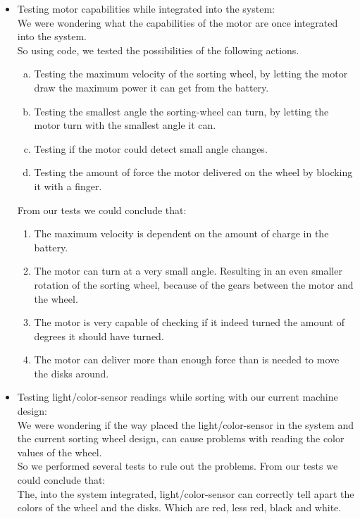 \begin{itemize}
\item Testing motor capabilities while integrated into the system:\\
We were wondering what the capabilities of the motor are once integrated into the system.\\
So using code, we tested the possibilities of the following actions.
\begin{enumerate}[a.]
\item{Testing the maximum velocity of the sorting wheel, by letting the motor draw the maximum power it can get from the battery.}
\item{Testing the smallest angle the sorting-wheel can turn, by letting the motor turn with the smallest angle it can.}
\item{Testing if the motor could detect small angle changes.}
\item{Testing the amount of force the motor delivered on the wheel by blocking it with a finger.}
\end{enumerate}
From our tests we could conclude that:
\begin{enumerate}
\item{The maximum velocity is dependent on the amount of charge in the battery.}
\item{The motor can turn at a very small angle. Resulting in an even smaller rotation of the sorting wheel, because of the gears between the motor and the wheel.}
\item{The motor is very capable of checking if it indeed turned the amount of degrees it should have turned.}
\item{The motor can deliver more than enough force than is needed to move the disks around.}\\
\end{enumerate}


\item Testing light/color-sensor readings while sorting with our current machine design:\\
We were wondering if the way placed the light/color-sensor in the system and the current sorting wheel design, can cause problems with reading the color values of the wheel. \\
So we performed several tests to rule out the problems.
From our tests we could conclude that:\\
The, into the system integrated, light/color-sensor can correctly tell apart the colors of the wheel and the disks. Which are red, less red, black and white.\\



\end{itemize}
